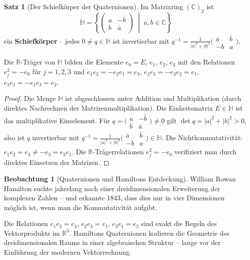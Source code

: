 ﻿\documentclass[a4paper,12pt]{report}
\theoremstyle{definition}
\newtheorem{satz}{Satz}
\newtheorem{beobachtung}{Beobachtung}
\begin{document}
\begin{satz}[Der Schiefkörper der Quaternionen]
    Im Matrixring $(\mathbb{C})_2$ ist
    \[
        \mathbb{H} = \left\{ \begin{pmatrix} a & -\overline{b} \\ b & \overline{a} \end{pmatrix}
        \;\middle|\; a, b \in \mathbb{C} \right\}
    \]
    ein \textbf{Schiefkörper} -- jedes $0 \neq q \in \mathbb{H}$ ist
    invertierbar mit $q^{-1} = \frac{1}{|a|^2+|b|^2}\bigl(\begin{smallmatrix}
    \overline{a} & \overline{b} \\ -b & a \end{smallmatrix}\bigr)$.

    Die $\mathbb{R}$-Träger von $\mathbb{H}$ bilden die Elemente
    $e_0 = E$, $e_1$, $e_2$, $e_3$ mit den Relationen
    $e_j^2 = -e_0$ für $j = 1,2,3$ und $e_1 e_2 = -e_2 e_1 = e_3$,
    $e_2 e_3 = -e_3 e_2 = e_1$, $e_3 e_1 = -e_1 e_3 = e_2$.
\end{satz}
\begin{proof}
    Die Menge $\mathbb{H}$ ist abgeschlossen unter Addition und Multiplikation
    (durch direktes Nachrechnen der Matrizenmultiplikation). Die Einheitsmatrix
    $E \in \mathbb{H}$ ist das multiplikative Einselement.
    Für $q = \bigl(\begin{smallmatrix} a & -\bar{b} \\ b & \bar{a} \end{smallmatrix}\bigr)
    \neq 0$ gilt $\det q = |a|^2 + |b|^2 > 0$, also ist $q$ invertierbar
    mit $q^{-1} = \frac{1}{|a|^2+|b|^2}\bigl(\begin{smallmatrix}\bar{a} & \bar{b}
    \\ -b & a \end{smallmatrix}\bigr) \in \mathbb{H}$.
    Die Nichtkommutativität: $e_1 e_2 = e_3 \neq -e_3 = e_2 e_1$.
    Die $\mathbb{R}$-Trägerrelationen $e_j^2 = -e_0$ verifiziert man durch
    direktes Einsetzen der Matrizen.
\end{proof}


\begin{beobachtung}[Quaternionen und Hamiltons Entdeckung]
    William Rowan Hamilton suchte jahrelang nach einer dreidimensionalen
    Erweiterung der komplexen Zahlen -- und erkannte 1843, dass dies nur
    in vier Dimensionen möglich ist, wenn man die Kommutativität aufgibt.

    Die Relationen $e_1 e_2 = e_3$, $e_2 e_3 = e_1$, $e_3 e_1 = e_2$
    sind exakt die Regeln des Vektorprodukts im $\mathbb{R}^3$.
    Hamiltons Quaternionen kodieren die Geometrie des dreidimensionalen
    Raums in einer algebraischen Struktur -- lange vor der Einführung
    der modernen Vektorrechnung.
\end{beobachtung}
\end{document}
